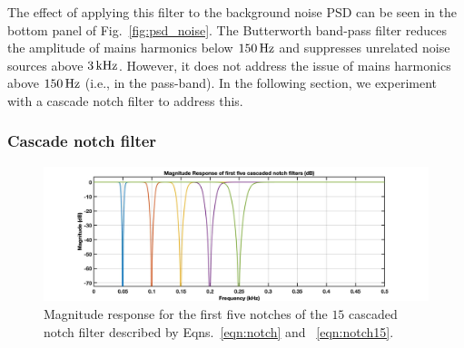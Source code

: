 \documentclass[paper-main.tex]{subfiles}
\begin{document}
The effect of applying this filter to the background noise PSD can be seen in the bottom panel of Fig.~\ref{fig:psd_noise}. The Butterworth band-pass filter reduces the amplitude of mains harmonics below $150\,{\rm Hz}$ and suppresses unrelated noise sources above $3\,{\rm kHz}$. However, it does not address the issue of mains harmonics above $150\,{\rm Hz}$ (i.e., in the pass-band). In the following section, we experiment with a cascade notch filter to address this.



\subsubsection{Cascade notch filter}
\label{sec:notch}
\begin{figure}
\begin{center}
\includegraphics[width=.9\textwidth]{figures/notch_filter_response.jpg}
\end{center}
\caption{\label{fig:notchMagResponse}
Magnitude response for the first five notches of the $15$ cascaded notch filter described by Eqns.~\ref{eqn:notch} and ~\ref{eqn:notch15}. 
}
\end{figure}
\end{document}
